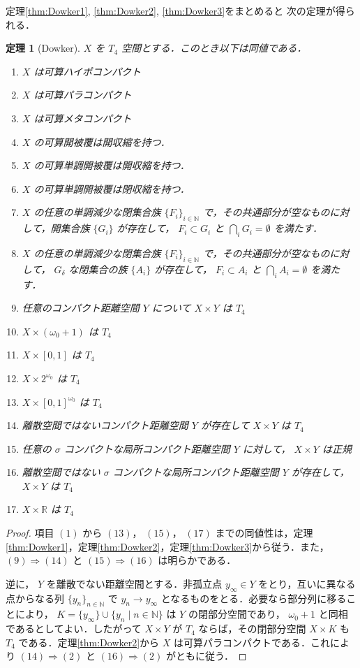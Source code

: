 \documentclass[leqno, 12pt]{ltjsarticle}
\newtheorem{thm}{定理}
\newcommand{\To}{\Longrightarrow}
\newcommand{\nn}{\mathbb{N}}
\newcommand{\rr}{\mathbb{R}}
\newcommand{\omegazero}{\omega_{0}}
\begin{document}
定理\ref{thm:Dowker1}, \ref{thm:Dowker2}, \ref{thm:Dowker3}をまとめると
次の定理が得られる．
\begin{thm}[Dowker]
$X$
を
$T_{4}$
空間とする．このとき以下は同値である．
\begin{enumerate}[label=\textup{(\arabic*)}]
\item
$X$
は可算ハイポコンパクト
\item
$X$
は可算パラコンパクト
\item
$X$
は可算メタコンパクト
\item
$X$
の可算開被覆は開収縮を持つ．
\item
$X$
の可算単調開被覆は開収縮を持つ．
\item
$X$
の可算単調開被覆は閉収縮を持つ．
\item
$X$
の任意の単調減少な閉集合族
$\{F_{i}\}_{i\in\nn}$
で，その共通部分が空なものに対して，開集合族
$\{G_{i}\}$
が存在して，
$F_{i}\subset G_{i}$
と
$\bigcap_{i} G_{i}=\emptyset$
を満たす．
\item
$X$
の任意の単調減少な閉集合族
$\{F_{i}\}_{i\in\nn}$
で，その共通部分が空なものに対して，
$G_{\delta}$
な閉集合の族
$\{A_{i}\}$
が存在して，
$F_{i}\subset A_{i}$
と
$\bigcap_{i} A_{i}=\emptyset$
を満たす．
\item 任意のコンパクト距離空間
$Y$
について
$X\times Y$
は
$T_{4}$
\item
$X\times (\omegazero+1)$
は
$T_{4}$
\item
$X\times [0,1]$
は
$T_{4}$
\item
$X\times 2^{\omegazero}$
は
$T_{4}$
\item
$X\times [0,1]^{\omegazero}$
は
$T_{4}$
\item 離散空間ではないコンパクト距離空間
$Y$
が存在して
$X\times Y$
は
$T_{4}$
\item 任意の
$\sigma$
コンパクトな局所コンパクト距離空間
$Y$
に対して，
$X\times Y$
は正規
\item 離散空間ではない
$\sigma$
コンパクトな局所コンパクト距離空間
$Y$
が存在して，
$X\times Y$
は
$T_{4}$
\item
$X\times \rr$
は
$T_{4}$
\end{enumerate}

\end{thm}
\begin{proof}
項目
$(1)$
から
$(13)$，
$(15)$，
$(17)$
までの同値性は，定理\ref{thm:Dowker1}，定理\ref{thm:Dowker2}，定理\ref{thm:Dowker3}から従う．また，
$(9)\To(14)$
と
$(15)\To(16)$
は明らかである．

逆に，
$Y$
を離散でない距離空間とする．非孤立点
$y_{\infty}\in Y$
をとり，互いに異なる点からなる列
$\{y_{n}\}_{n\in\nn}$
で
$y_{n}\to y_{\infty}$
となるものをとる．必要なら部分列に移ることにより，
$K=\{y_{\infty}\}\cup\{y_{n} \mid n\in\nn\}$
は
$Y$
の閉部分空間であり，
$\omegazero+1$
と同相であるとしてよい．したがって
$X\times Y$
が
$T_{4}$
ならば，その閉部分空間
$X\times K$
も
$T_{4}$
である．定理\ref{thm:Dowker2}から
$X$
は可算パラコンパクトである．これにより
$(14)\To(2)$
と
$(16)\To(2)$
がともに従う．
\end{proof}
\end{document}
